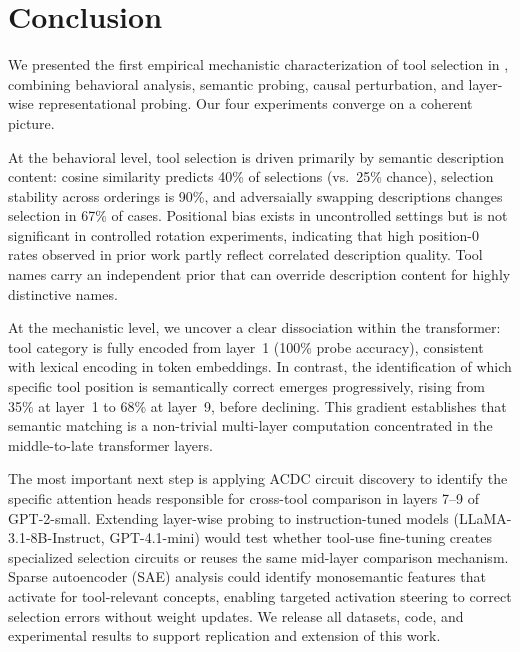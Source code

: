 \section{Conclusion}
\label{sec:conclusion}

We presented the first empirical mechanistic characterization of tool selection in \LLMs,
combining behavioral analysis, semantic probing, causal perturbation, and layer-wise
representational probing.  Our four experiments converge on a coherent picture.

At the behavioral level, tool selection is driven primarily by semantic description
content: cosine similarity predicts 40\% of selections (vs.\ 25\% chance), selection
stability across orderings is 90\%, and adversaially swapping descriptions changes
selection in 67\% of cases.  Positional bias exists in uncontrolled settings but is not
significant in controlled rotation experiments, indicating that high position-0 rates
observed in prior work partly reflect correlated description quality.  Tool names carry
an independent prior that can override description content for highly distinctive names.

At the mechanistic level, we uncover a clear dissociation within the \gpttwo transformer:
tool category is fully encoded from layer~1 (100\% probe accuracy), consistent with
lexical encoding in token embeddings.  In contrast, the identification of which specific
tool position is semantically correct emerges progressively, rising from 35\% at layer~1
to 68\% at layer~9, before declining.  This gradient establishes that semantic matching
is a non-trivial multi-layer computation concentrated in the middle-to-late transformer
layers.

  The most important next step is applying ACDC circuit discovery
\citep{conmy2023acdc} to identify the specific attention heads responsible for cross-tool
comparison in layers 7--9 of GPT-2-small.  Extending layer-wise probing to instruction-tuned
models (LLaMA-3.1-8B-Instruct, GPT-4.1-mini) would test whether tool-use fine-tuning
creates specialized selection circuits or reuses the same mid-layer comparison mechanism.
Sparse autoencoder (SAE) analysis \citep{sharkey2025open} could identify monosemantic
features that activate for tool-relevant concepts, enabling targeted activation steering
to correct selection errors without weight updates.  We release all datasets, code, and
experimental results to support replication and extension of this work.
